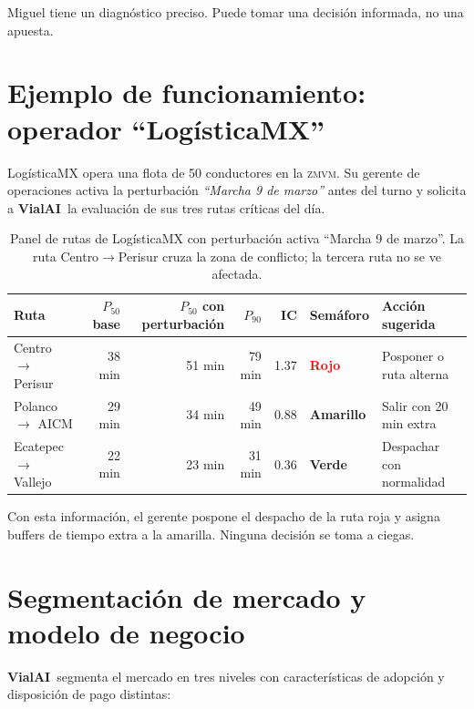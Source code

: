 \documentclass[11pt,a4paper]{article}
\newcommand{\VialAI}{\textbf{\textcolor{vialTeal}{Vial}\textcolor{vialAmber}{AI}}}
\newcommand{\ZMVM}{\textsc{zmvm}}
\begin{document}
Miguel tiene un diagnóstico preciso. Puede tomar una decisión
informada, no una apuesta.

\section{Ejemplo de funcionamiento: operador ``LogísticaMX''}

LogísticaMX opera una flota de \num{50} conductores en la \ZMVM.
Su gerente de operaciones activa la perturbación
\emph{``Marcha 9 de marzo''} antes del turno y solicita a \VialAI\
la evaluación de sus tres rutas críticas del día.

\begin{table}[H]
\centering
\small
\renewcommand{\arraystretch}{1.4}
\begin{tabular}{@{}lrrrrll@{}}
\toprule
\rowcolor{vialNavy!10}
\textbf{Ruta} & $P_{50}$ base & $P_{50}$ con perturbación
              & $P_{90}$ & IC & \textbf{Semáforo} & \textbf{Acción sugerida} \\
\midrule
Centro $\to$ Perisur & 38 min & 51 min & 79 min & 1.37 & \textcolor{red}{\textbf{Rojo}}
  & Posponer o ruta alterna \\
Polanco $\to$ AICM   & 29 min & 34 min & 49 min & 0.88 & \textcolor{vialAmber!80!black}{\textbf{Amarillo}}
  & Salir con \num{20} min extra \\
Ecatepec $\to$ Vallejo & 22 min & 23 min & 31 min & 0.36 & \textcolor{green!60!black}{\textbf{Verde}}
  & Despachar con normalidad \\
\bottomrule
\end{tabular}
\caption{Panel de rutas de LogísticaMX con perturbación activa ``Marcha 9 de marzo''.
         La ruta Centro$\to$Perisur cruza la zona de conflicto; la tercera ruta no
         se ve afectada.}
\label{tab:flota}
\end{table}

Con esta información, el gerente pospone el despacho de la ruta roja
y asigna buffers de tiempo extra a la amarilla. Ninguna decisión se
toma a ciegas.

\section{Segmentación de mercado y modelo de negocio}

\VialAI\ segmenta el mercado en tres niveles con características de
adopción y disposición de pago distintas:
\end{document}
